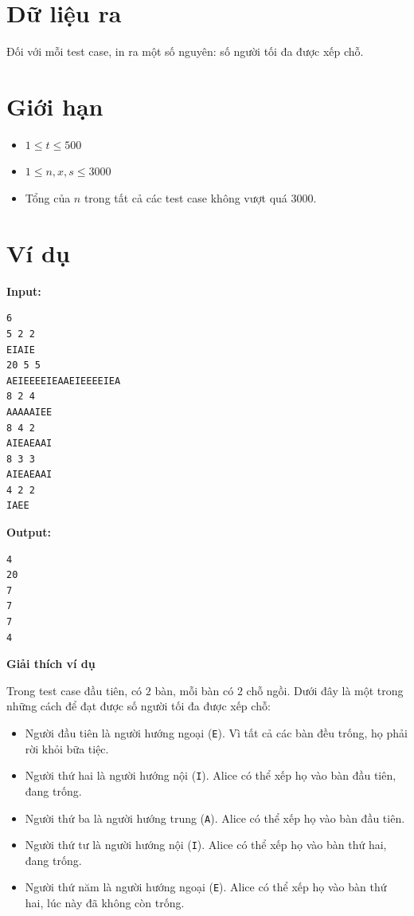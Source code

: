 \documentclass[12pt,a4paper]{article}
\newcommand{\explanation}{%
  \vspace{6pt}\textbf{\textcolor{sectioncolor}{Giải thích ví dụ}}\par\vspace{2pt}%
}
\begin{document}
\section*{Dữ liệu ra}
\begin{outputbox}
Đối với mỗi test case, in ra một số nguyên: số người tối đa được xếp chỗ.
\end{outputbox}

\section*{Giới hạn}
\begin{constraintbox}
\begin{itemize}
    \item $1 \le t \le 500$
    \item $1 \le n, x, s \le 3000$
    \item Tổng của $n$ trong tất cả các test case không vượt quá $3000$.
\end{itemize}
\end{constraintbox}

\section*{Ví dụ}
\textbf{Input:}
\begin{lstlisting}
6
5 2 2
EIAIE
20 5 5
AEIEEEEIEAAEIEEEEIEA
8 2 4
AAAAAIEE
8 4 2
AIEAEAAI
8 3 3
AIEAEAAI
4 2 2
IAEE
\end{lstlisting}

\textbf{Output:}
\begin{lstlisting}
4
20
7
7
7
4
\end{lstlisting}

\explanation
Trong test case đầu tiên, có $2$ bàn, mỗi bàn có $2$ chỗ ngồi. Dưới đây là một trong những cách để đạt được số người tối đa được xếp chỗ:

\begin{itemize}
    \item Người đầu tiên là người hướng ngoại (\texttt{E}). Vì tất cả các bàn đều trống, họ phải rời khỏi bữa tiệc.
    \item Người thứ hai là người hướng nội (\texttt{I}). Alice có thể xếp họ vào bàn đầu tiên, đang trống.
    \item Người thứ ba là người hướng trung (\texttt{A}). Alice có thể xếp họ vào bàn đầu tiên.
    \item Người thứ tư là người hướng nội (\texttt{I}). Alice có thể xếp họ vào bàn thứ hai, đang trống.
    \item Người thứ năm là người hướng ngoại (\texttt{E}). Alice có thể xếp họ vào bàn thứ hai, lúc này đã không còn trống.
\end{itemize}
\end{document}
